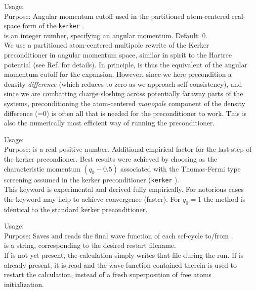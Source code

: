 {
  \noindent
  Usage:   \\[1.0ex]
  Purpose: Angular momentum cutoff used in the partitioned
    atom-centered real-space form of the \texttt{kerker}
    . \\[1.0ex]
   is an integer number, specifying an angular
    momentum. Default: 0. \\
}
We use a partitioned atom-centered multipole rewrite of the Kerker
preconditioner in angular momentum space, similar in spirit to the
Hartree potential (see Ref. \cite{Blum08} for details). In principle,
 is thus the equivalent of the
 angular momentum cutoff for the expansion.
However, since
we here precondition a density \emph{difference} (which reduces to
zero as we approach self-consistency), and since we are combatting
charge sloshing across potentially faraway parts of the systems,
preconditioning the atom-centered \emph{monopole} component of the
density difference (=0) is often all that is needed
for the preconditioner to work. This is also the numerically most
efficient way of running the preconditioner.

{
  \noindent
  Usage:   \\[1.0ex]
  Purpose:  is a real
        positive number. Additional empirical factor for the last 
        step of the kerker precondioner. Best results were achieved by 
        choosing  as the characteristic momentum $(q_0-0.5)$
        associated with the Thomas-Fermi type screening assumed in the
        kerker preconditioner (\texttt{kerker}
    ). \\[1.0ex]
}
This keyword is experimental and derived fully empirically. For notorious cases 
the keyword may help to achieve convergence (faster). For $q_0=1$ the method is 
identical to the standard kerker preconditioner.

{
  \noindent
  Usage:   \\[1.0ex]
  Purpose: Saves and reads the final wave function of each scf-cycle
    to/from .\\[1.0ex]
   is a string, corresponding to the desired restart filename. \\
}
If  is not yet present, the calculation simply writes
that file during the run. If  is already present, it is
read and the wave function contained therein is used to restart the
calculation, instead of a fresh superposition of free atoms
initialization. 


